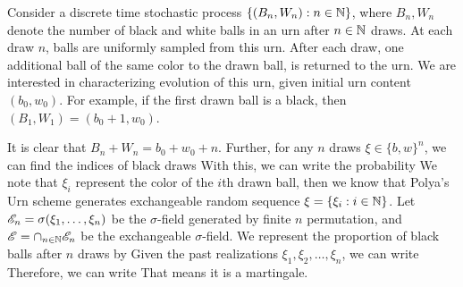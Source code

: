 \documentclass[a4paper,english,10pt]{article}
\begin{document}
Consider a discrete time stochastic process $\{(B_n,W_n): n \in \mathbb{N}\}$, where $B_n, W_n$ denote the number of black and white balls in an urn after $n \in \mathbb{N}$ draws. 
At each draw $n$, balls are uniformly sampled from this urn. 
After each draw, one additional ball of the same color to the drawn ball, is returned to the urn. 
We are interested in characterizing evolution of this urn, given initial urn content $(b_0,w_0)$.  
For example, if the first drawn ball is a black, then $(B_1,W_1) = (b_0+1, w_0)$. 

It is clear that $B_n+W_n = b_0+w_0+n$. 
Further, for any $n$ draws $\xi \in \{b,w\}^n$, we can find the indices of black draws
With this, we can write the probability 
We note that $\xi_i$ represent the color of the $i$th drawn ball, then we know that Polya's Urn scheme generates exchangeable random sequence $\xi = \{\xi_i : i \in \mathbb{N}\}$.
Let $\mathscr{E}_n = \sigma(\xi_1, \dots, \xi_n)$ be the $\sigma$-field generated by finite $n$ permutation, and $\mathscr{E} = \cap_{n \in \mathbb{N}}\mathscr{E}_n$ be the exchangeable $\sigma$-field.
We represent the proportion of black balls after $n$ draws by 
Given the past realizations $\xi_1,\xi_2,\dots,\xi_n$, we can write 
Therefore, we can write 
That means it is a martingale.
\end{document}
